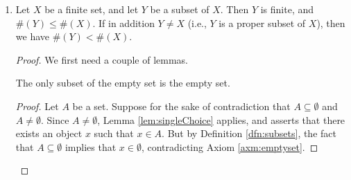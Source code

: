 \documentclass[../main.tex]{subfiles}
\begin{document}
\begin{enumerate}[ref={\thesection.\arabic*}]
\begin{prp}
\begin{enumerate}[label={\textup{(}\alph*\textup{)}},ref={\theenumi\alph*}]
\begin{proof}
                \begin{align*}
                    \#(X\cup Y) &= \#((X\cup (Y\setminus\{y\}))\cup\{y\})
                    \intertext{Since $X\cup(Y\setminus\{y\})$ is a finite set and $y$ is not an element of it (Lemma \ref{lem:disjointSetminus}), Exercise \ref{exr:3.6.4a} applies. As such, we have that $\#((X\cup (Y\setminus\{y\}))\cup\{y\})=\#(X\cup(Y\setminus\{y\}))+1$. Thus, continuing from the above equation, we can write}
                    &= \#(X\cup(Y\setminus\{y\}))+1
                    \intertext{Since $X$ and $Y\setminus\{y\}$ are finite by hypothesis, $X\cap(Y\setminus\{y\})=\emptyset$ by Lemma \ref{lem:intersectionSetminus}, and $\#(Y\setminus\{y\})=m$ as established above, the induction hypothesis applies and asserts that $\#(X\cup(Y\setminus\{y\}))=\#(X)+\#(Y\setminus\{y\})$. Thus, we can write}
                    &= \#(X)+\#(Y\setminus\{y\})+1
                    \intertext{By Lemma \ref{lem:cardinalitySetminus}, $\#(Y\setminus\{y\})=\#(Y)-1$. Substituting, we may write}
                    &= \#(X)+\#(Y)-1+1
                    \intertext{Since $X$ and $Y$ are finite, $\#(X)$ and $\#(Y)$ are natural numbers. Thus, by Definition \ref{dfn:addition}, $\#(X)+\#(Y)$ is a natural number. Consequently, Lemma \ref{lem:n-1+1} applies, and we can at last conclude the following.}
                    &= \#(X)+\#(Y)
                \end{align*}
            \end{proof}
            \item \label{exr:3.6.4c}Let $X$ be a finite set, and let $Y$ be a subset of $X$. Then $Y$ is finite, and $\#(Y)\leq\#(X)$. If in addition $Y\neq X$ (i.e., $Y$ is a proper subset of $X$), then we have $\#(Y)<\#(X)$.
            \begin{proof}
                We first need a couple of lemmas.
                \begin{lem}\label{lem:subsetsOfEmptyset}
                    The only subset of the empty set is the empty set.
                    \begin{proof}
                        Let $A$ be a set. Suppose for the sake of contradiction that $A\subseteq\emptyset$ and $A\neq\emptyset$. Since $A\neq\emptyset$, Lemma \ref{lem:singleChoice} applies, and asserts that there exists an object $x$ such that $x\in A$. But by Definition \ref{dfn:subsets}, the fact that $A\subseteq\emptyset$ implies that $x\in\emptyset$, contradicting Axiom \ref{axm:emptyset}.
                    \end{proof}

\end{lem}
\end{proof}
\end{enumerate}
\end{prp}
\end{enumerate}
\end{document}
